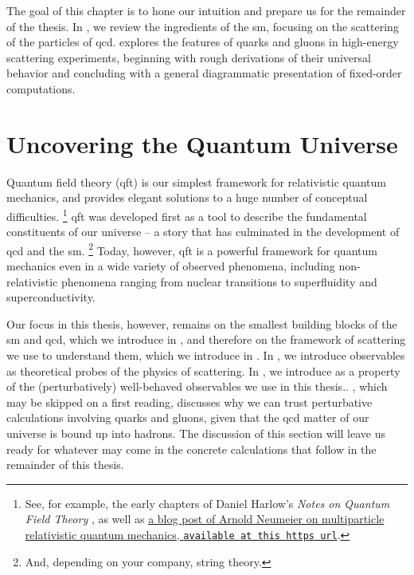 The goal of this chapter is to hone our intuition and prepare us for the remainder of the thesis.
%
In , we review the ingredients of the \gls{sm}, focusing on the scattering of the particles of \gls{qcd}.
%
 explores the features of quarks and gluons in high-energy scattering experiments, beginning with rough derivations of their universal behavior and concluding with a general diagrammatic presentation of fixed-order computations.



\section{Uncovering the Quantum Universe}
\label{sec:sm-scattering-review}

Quantum field theory (\gls{qft}) is our simplest framework for relativistic quantum mechanics, and provides elegant solutions to a huge number of conceptual difficulties.%
\footnote{
See, for example, the early chapters of Daniel Harlow's  \textit{Notes on Quantum Field Theory} \cite{Harlow:2024zz}, as well as \href{https://arnold-neumaier.at/physfaq/topics/multi.html}{a blog post of Arnold Neumeier on multiparticle relativistic quantum mechanics, \texttt{available at this https url}}.
}
%
\Gls{qft} was developed first as a tool to describe the fundamental constituents of our universe -- a story that has culminated in the development of \gls{qcd} and the \gls{sm}.%
\footnote{
    And, depending on your company, string theory.
}
%
Today, however, \gls{qft} is a powerful framework for quantum mechanics even in a wide variety of observed phenomena, including non-relativistic phenomena ranging from nuclear transitions to superfluidity and superconductivity.

Our focus in this thesis, however, remains on the smallest building blocks of the \gls{sm} and \gls{qcd}, which we introduce in , and therefore on the framework of \gls{scattering} we use to understand them, which we introduce in .
%
In , we introduce \glspl{observable} as theoretical probes of the physics of scattering.
%
In , we introduce  as a property of the (perturbatively) well-behaved \glspl{observable} we use in this thesis..
%
, which may be skipped on a first reading, discusses why we can trust perturbative calculations involving quarks and gluons, given that the \gls{qcd} matter of our universe is bound up into hadrons.
%
The discussion of this section will leave us ready for whatever may come in the concrete calculations that follow in the remainder of this thesis.


